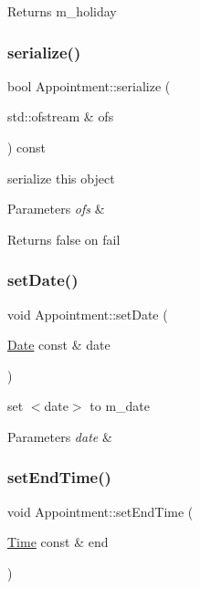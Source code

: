 \begin{DoxyReturn}{Returns}
m\+\_\+holiday 
\end{DoxyReturn}
\mbox{\label{classAppointment_a2542a8dd24e926a2531f1d88bbf4dd88}} 
\subsubsection{\texorpdfstring{serialize()}{serialize()}}
{\footnotesize\ttfamily bool Appointment\+::serialize (\begin{DoxyParamCaption}\item[{std\+::ofstream \&}]{ofs }\end{DoxyParamCaption}) const}

serialize this object 
\begin{DoxyParams}{Parameters}
{\em ofs} & \\
\hline
\end{DoxyParams}
\begin{DoxyReturn}{Returns}
false on fail 
\end{DoxyReturn}
\mbox{\label{classAppointment_a0a69e652f7d3fa5091330a92479749a6}} 
\subsubsection{\texorpdfstring{set\+Date()}{setDate()}}
{\footnotesize\ttfamily void Appointment\+::set\+Date (\begin{DoxyParamCaption}\item[{\hyperlink{classDate}{Date} const \&}]{date }\end{DoxyParamCaption})}

set $<$date$>$ to m\+\_\+date 
\begin{DoxyParams}{Parameters}
{\em date} & \\
\hline
\end{DoxyParams}
\mbox{\label{classAppointment_a9e6455381eebacbaa3aa98ad3707baac}} 
\subsubsection{\texorpdfstring{set\+End\+Time()}{setEndTime()}}
{\footnotesize\ttfamily void Appointment\+::set\+End\+Time (\begin{DoxyParamCaption}\item[{\hyperlink{classTime}{Time} const \&}]{end }\end{DoxyParamCaption})}

